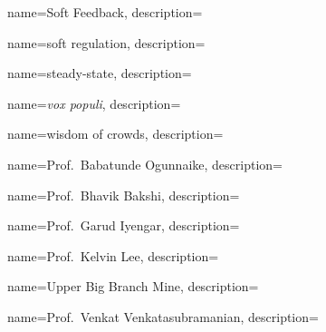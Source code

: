 	{
		name={Soft Feedback},
		description={}
	}

	{
		name={soft regulation},
		description={}
	}
	
	{
		name={steady-state},
		description={}
	}	
		

	{
		name={\emph{vox populi}},
		description={}
	}	


	{
		name={wisdom of crowds},
		description={}
	}
	
	
	{
		name={Prof.~Babatunde Ogunnaike},
		description={}
	}	

	{
		name={Prof.~Bhavik Bakshi},
		description={}
	}

	{
		name={Prof.~Garud Iyengar},
		description={}
	}	
	
	{
		name={Prof.~Kelvin Lee},
		description={}
	}	
	
	{
		name={Upper Big Branch Mine},
		description={}
	}

	{
		name={Prof.~Venkat Venkatasubramanian},
		description={}
	}










